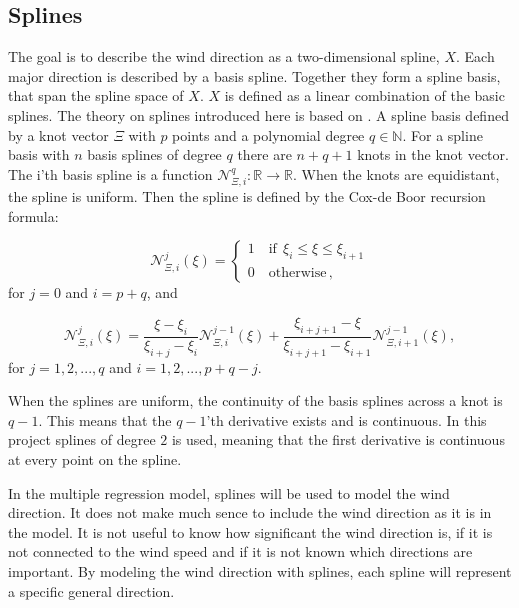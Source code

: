 \subsection{Splines}
The goal is to describe the wind direction as a two-dimensional spline, $X$. Each major direction is described by a basis spline. Together they form a spline basis, that span the spline space of $X$. $X$ is defined as a linear combination of the basic splines. The theory on splines introduced here is based on \cite{Splines}. A spline basis defined by a knot vector $\Xi$ with $p$ points and a polynomial degree $q\in \mathbb{N}$. For a spline basis with $n$ basis splines of degree $q$ there are $n+q+1$ knots in the knot vector. The i'th basis spline is a function $\mathcal{N}^q_{\Xi,i}: \mathbb{R} \rightarrow \mathbb{R}$. When the knots are equidistant, the spline is uniform. Then the spline is defined by the Cox-de Boor recursion formula:

\begin{equation}
    \mathcal{N}_{\Xi,i}^j (\xi) =
    \begin{cases}
    1 \quad \text{if} \ \ \xi_i \leq \xi \leq \xi_{i+1}\\
    0 \quad \text{otherwise}\,,
    \end{cases}
    \end{equation}
    for $j = 0$ and $i = p + q$, and 
    
    \begin{equation}
        \mathcal{N}_{\Xi,i}^j(\xi) = \frac{\xi-\xi_i}{\xi_{i+j}-\xi_i}\mathcal{N}_{\Xi,i}^{j-1}(\xi) + \frac{\xi_{i+j+1}-\xi}{\xi_{i+j+1}-\xi_{i+1}} \mathcal{N}_{\Xi, i + 1}^{j-1}(\xi),
    \end{equation}
    for $j = 1,2,..., q$ and $i = 1,2,..., p + q - j$. 

\noindent When the splines are uniform, the continuity of the basis splines across a knot is $q-1$. This means that the $q-1$'th derivative exists and is continuous. In this project splines of degree $2$ is used, meaning that the first derivative is continuous at every point on the spline.


In the multiple regression model, splines will be used to model the wind direction. It does not make much sence to include the wind direction as it is in the model. It is not useful to know how significant the wind direction is, if it is not connected to the wind speed and if it is not known which directions are important. By modeling the wind direction with splines, each spline will represent a specific general direction.


